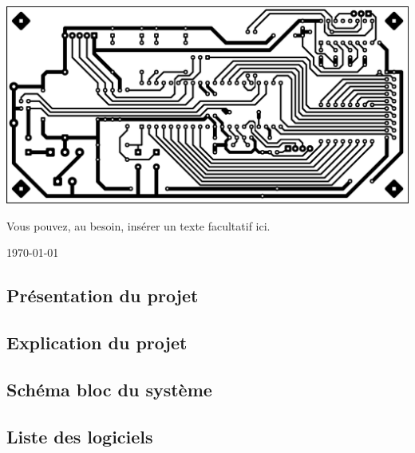 \documentclass[10pt,a4paper,final]{article}
\begin{document}
\begin{center}
\begin{multicols}{2}
\begin{flushright}
\end{flushright}
\end{multicols}

\bigskip
\bigskip
\bigskip
\bigskip
\bigskip
\bigskip

\includegraphics[scale=0.08]{Figures/Picture_for_Title.jpg} 

\vfill
Vous pouvez, au besoin, insérer un texte facultatif ici.
\bigskip

{\large \today}
\end{center}






\pagebreak
\begin{spacing}{1.5}
\tableofcontents 
\listoffigures  
\listoftables 
\end{spacing}  
\pagebreak






\renewcommand\headrulewidth{1pt}

\renewcommand\footrulewidth{1pt}
\fancyfoot[R]{\today}
\begin{spacing}{1.5}

\section{Présentation du projet}

\subsection{Explication du projet}

\subsection{Schéma bloc du système}

\subsection{Liste des logiciels}










\end{spacing}
\end{document}
